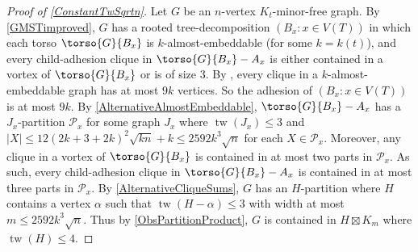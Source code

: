 \documentclass[12pt]{article}
\renewcommand{\leq}{\leqslant}
\DeclareMathOperator{\tw}{tw}
\newcommand{\PP}{\mathcal{P}}
\theoremstyle{plain}
\theoremstyle{definition}
\begin{document}
\begin{proof}[Proof of \cref{ConstantTwSqrtn}]
    Let $G$ be an $n$-vertex $K_t$-minor-free graph. By \cref{GMSTimproved}, $G$ has a rooted tree-decomposition $(B_x:x\in V(T))$ in which each torso $\torso{G}{B_x}$ is $k$-almost-embeddable (for some $k=k(t)$), and every child-adhesion clique in $\torso{G}{B_x}-A_x$ is either contained in a vortex of $\torso{G}{B_x}$ or is of size $3$. By \citep[Lemma 21]{DMW17}, every clique in a $k$-almost-embeddable graph has at most $9k$ vertices. So the adhesion of $(B_x:x\in V(T))$ is at most $9k$. By \cref{AlternativeAlmostEmbeddable}, $\torso{G}{B_x}-A_x$ has a $J_x$-partition $\PP_x$ for some graph $J_x$ where $\tw(J_x)\leq 3$ and $|X|\leq 12(2k+3+2k)^2\sqrt{kn}+k\leq 2592 k^3\sqrt{n}$ for each $X\in\PP_x$. Moreover, any clique in a vortex of $\torso{G}{B_x}$ is contained in at most two parts in $\PP_x$. As such, every child-adhesion clique in $\torso{G}{B_x}-A_x$ is contained in at most three parts in $\PP_x$. By \cref{AlternativeCliqueSums}, $G$ has an $H$-partition where $H$ contains a vertex $\alpha$ such that $\tw(H-\alpha)\leq 3$ with width at most $m\leq 2592 k^3\sqrt{n}$. Thus by \cref{ObsPartitionProduct}, $G$ is contained in $H\boxtimes K_m$ where $\tw(H)\leq 4$.
\end{proof}
\end{document}
